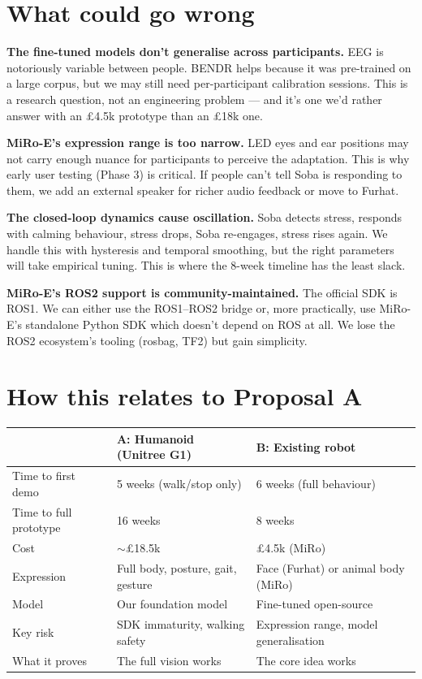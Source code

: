 \documentclass[11pt,a4paper]{article}
\begin{document}
\section{What could go wrong}

\textbf{The fine-tuned models don't generalise across participants.} EEG is notoriously variable between people. BENDR helps because it was pre-trained on a large corpus, but we may still need per-participant calibration sessions. This is a research question, not an engineering problem --- and it's one we'd rather answer with an \pounds 4.5k prototype than an \pounds 18k one.

\textbf{MiRo-E's expression range is too narrow.} LED eyes and ear positions may not carry enough nuance for participants to perceive the adaptation. This is why early user testing (Phase 3) is critical. If people can't tell Soba is responding to them, we add an external speaker for richer audio feedback or move to Furhat.

\textbf{The closed-loop dynamics cause oscillation.} Soba detects stress, responds with calming behaviour, stress drops, Soba re-engages, stress rises again. We handle this with hysteresis and temporal smoothing, but the right parameters will take empirical tuning. This is where the 8-week timeline has the least slack.

\textbf{MiRo-E's ROS2 support is community-maintained.} The official SDK is ROS1. We can either use the ROS1--ROS2 bridge or, more practically, use MiRo-E's standalone Python SDK which doesn't depend on ROS at all. We lose the ROS2 ecosystem's tooling (rosbag, TF2) but gain simplicity.

\section{How this relates to Proposal A}

\begin{table}[H]
\centering\small
\begin{tabularx}{\textwidth}{lXX}
\toprule
& \textbf{A: Humanoid (Unitree G1)} & \textbf{B: Existing robot} \\
\midrule
Time to first demo & 5 weeks (walk/stop only) & 6 weeks (full behaviour) \\
Time to full prototype & 16 weeks & 8 weeks \\
Cost & $\sim$\pounds 18.5k & \pounds 4.5k (MiRo) \\
Expression & Full body, posture, gait, gesture & Face (Furhat) or animal body (MiRo) \\
Model & Our foundation model & Fine-tuned open-source \\
Key risk & SDK immaturity, walking safety & Expression range, model generalisation \\
What it proves & The full vision works & The core idea works \\
\bottomrule
\end{tabularx}
\end{table}
\end{document}
